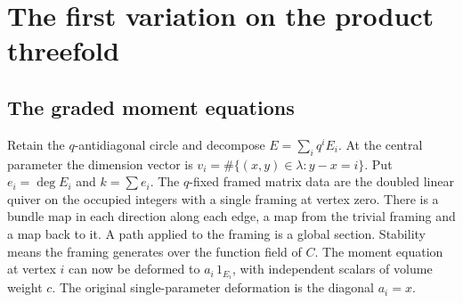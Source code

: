 \section{The first variation on the product threefold}\label{sec:walls}
\subsection{The graded moment equations}

Retain the $q$-antidiagonal circle and decompose $E=\sum_i q^i E_i$. At the central parameter the dimension vector is $v_i=\#\{(x,y)\in\lambda:y-x=i\}$. Put $e_i=\deg E_i$ and $k=\sum e_i$. The $q$-fixed framed matrix data are the doubled linear quiver on the occupied integers with a single framing at vertex zero. There is a bundle map in each direction along each edge, a map from the trivial framing and a map back to it. A path applied to the framing is a global section. Stability means the framing generates over the function field of $C$. The moment equation at vertex $i$ can now be deformed to $a_i\,1_{E_i}$, with independent scalars of volume weight $c$. The original single-parameter deformation is the diagonal $a_i=x$.

